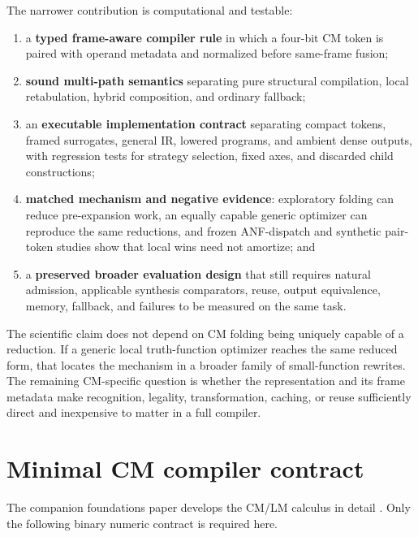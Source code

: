 \documentclass[10pt]{article}
\theoremstyle{plain}
\theoremstyle{definition}
\theoremstyle{remark}
\begin{document}
The narrower contribution is computational and testable:
\begin{enumerate}
  \item a \textbf{typed frame-aware compiler rule} in which a four-bit CM token is paired with operand metadata and normalized before same-frame fusion;
  \item \textbf{sound multi-path semantics} separating pure structural compilation, local retabulation, hybrid composition, and ordinary fallback;
  \item an \textbf{executable implementation contract} separating compact tokens, framed surrogates, general IR, lowered programs, and ambient dense outputs, with regression tests for strategy selection, fixed axes, and discarded child constructions;
  \item \textbf{matched mechanism and negative evidence}: exploratory folding can reduce pre-expansion work, an equally capable generic optimizer can reproduce the same reductions, and frozen ANF-dispatch and synthetic pair-token studies show that local wins need not amortize; and
  \item a \textbf{preserved broader evaluation design} that still requires natural admission, applicable synthesis comparators, reuse, output equivalence, memory, fallback, and failures to be measured on the same task.
\end{enumerate}

The scientific claim does not depend on CM folding being uniquely capable of a reduction. If a generic local truth-function optimizer reaches the same reduced form, that locates the mechanism in a broader family of small-function rewrites. The remaining CM-specific question is whether the representation and its frame metadata make recognition, legality, transformation, caching, or reuse sufficiently direct and inexpensive to matter in a full compiler.

\section{Minimal CM compiler contract}
\label{sec:minimal-contract}

The companion foundations paper develops the CM/LM calculus in detail \cite{TheoryFoundations2026}. Only the following binary numeric contract is required here.
\end{document}
